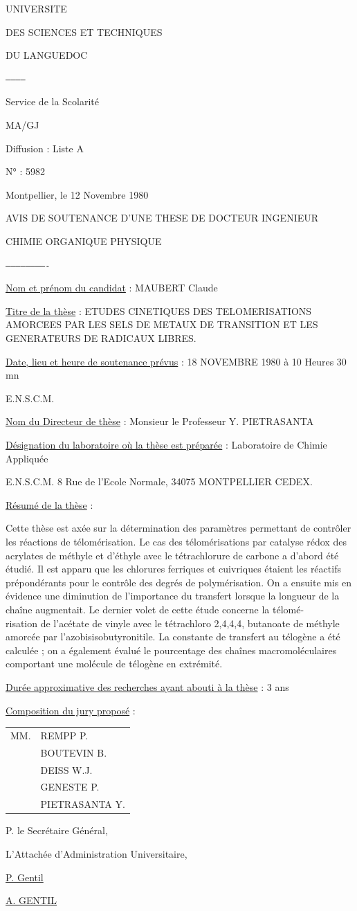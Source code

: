 UNIVERSITE

DES SCIENCES ET TECHNIQUES

DU LANGUEDOC

\texttt{------------}

Service de la Scolarité

MA/GJ

Diffusion : Liste A

N° : 5982

Montpellier, le 12 Novembre 1980

AVIS DE SOUTENANCE D'UNE THESE DE DOCTEUR INGENIEUR

CHIMIE ORGANIQUE PHYSIQUE

\texttt{-------------------------}

\uline{Nom et prénom du candidat} : MAUBERT Claude

\uline{Titre de la thèse} : ETUDES CINETIQUES DES TELOMERISATIONS AMORCEES PAR LES SELS DE METAUX DE TRANSITION ET LES GENERATEURS DE RADICAUX LIBRES.

\uline{Date, lieu et heure de soutenance prévus} : 18 NOVEMBRE 1980 à 10 Heures 30 mn

E.N.S.C.M.

\uline{Nom du Directeur de thèse} : Monsieur le Professeur Y. PIETRASANTA

\uline{Désignation du laboratoire où la thèse est préparée} : Laboratoire de Chimie Appliquée

E.N.S.C.M. 8 Rue de l'Ecole Normale, 34075 MONTPELLIER CEDEX.

\uline{Résumé de la thèse} :

Cette thèse est axée sur la détermination des paramètres permettant de contrôler les réactions de télomérisation. Le cas des télomérisations par catalyse rédox des acrylates de méthyle et d'éthyle avec le tétrachlorure de carbone a d'abord été étudié. Il est apparu que les chlorures ferriques et cuivriques étaient les réactifs prépondérants pour le contrôle des degrés de polymérisation. On a ensuite mis en évidence une diminution de l'importance du transfert lorsque la longueur de la chaîne augmentait. Le dernier volet de cette étude concerne la télomé-\\
risation de l'acétate de vinyle avec le tétrachloro 2,4,4,4, butanoate de méthyle amorcée par l'azobisisobutyronitile. La constante de transfert au télogène a été calculée ; on a également évalué le pourcentage des chaînes macromoléculaires comportant une molécule de télogène en extrémité.

\uline{Durée approximative des recherches ayant abouti à la thèse} : 3 ans

\uline{Composition du jury proposé} :
\begin{tabular}{ll}
MM.&REMPP P.\\
& BOUTEVIN B.\\
& DEISS W.J.\\
& GENESTE P.\\
& PIETRASANTA Y.
\end{tabular}

P. le Secrétaire Général,

L'Attachée d'Administration Universitaire,

\uline{P. Gentil}

\uline{A. GENTIL}
